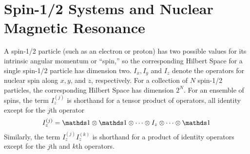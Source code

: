 \section{Spin-1/2 Systems and Nuclear Magnetic Resonance}

A spin-1/2 particle (such as an electron or proton) has two possible values for its intrinsic angular momentum or ``spin,'' so the corresponding Hilbert Space for a single spin-1/2 particle has dimension two. $I_x, I_y$ and $I_z$ denote the operators for nuclear spin along $x, y$, and $z$, respectively. For a collection of $N$ spin-1/2 particles, the corresponding Hilbert Space has dimension $2^N$.
For an ensemble of spins, the term $I_z^{(j)}$ is shorthand for a tensor product of operators, all identity except for the $j$th operator
\[
I_z^{(j)} = \identity \otimes \identity \otimes \dots \otimes I_z \otimes \dots \otimes \identity
\]
Similarly, the term $I_z^{(j)}I_z^{(k)}$ is shorthand for a product of identity operators except for the $j$th and $k$th operators.

